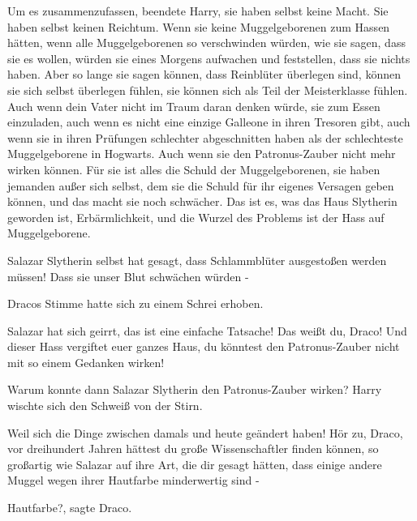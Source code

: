 \glqq Um es zusammenzufassen\grqq{}, beendete Harry, \glqq sie haben selbst
keine Macht. Sie haben selbst keinen Reichtum. Wenn sie keine Muggelgeborenen
zum Hassen hätten, wenn alle Muggelgeborenen so verschwinden würden, wie sie
sagen, dass sie es wollen, würden sie eines Morgens aufwachen und feststellen,
dass sie nichts haben. Aber so lange sie sagen können, dass Reinblüter überlegen
sind, können sie sich selbst überlegen fühlen, sie können sich als Teil der
Meisterklasse fühlen. Auch wenn dein Vater nicht im Traum daran denken würde,
sie zum Essen einzuladen, auch wenn es nicht eine einzige Galleone in ihren
Tresoren gibt, auch wenn sie in ihren Prüfungen schlechter abgeschnitten haben
als der schlechteste Muggelgeborene in Hogwarts. Auch wenn sie den
Patronus-Zauber nicht mehr wirken können. Für sie ist alles die Schuld der
Muggelgeborenen, sie haben jemanden außer sich selbst, dem sie die Schuld für
ihr eigenes Versagen geben können, und das macht sie noch schwächer. Das ist es,
was das Haus Slytherin geworden ist, Erbärmlichkeit, und die Wurzel des Problems
ist der Hass auf Muggelgeborene.\grqq{}

\glqq Salazar Slytherin selbst hat gesagt, dass Schlammblüter ausgestoßen werden
müssen! Dass sie unser Blut schwächen würden -\grqq{}

Dracos Stimme hatte sich zu einem Schrei erhoben.

\glqq Salazar hat sich geirrt, das ist eine einfache Tatsache! Das weißt du,
Draco! Und dieser Hass vergiftet euer ganzes Haus, du könntest den
Patronus-Zauber nicht mit so einem Gedanken wirken!\grqq{}

\glqq Warum konnte dann Salazar Slytherin den Patronus-Zauber wirken?\grqq{}
Harry wischte sich den Schweiß von der Stirn.

\glqq Weil sich die Dinge zwischen damals und heute geändert haben! Hör zu,
Draco, vor dreihundert Jahren hättest du große Wissenschaftler finden können, so
großartig wie Salazar auf ihre Art, die dir gesagt hätten, dass einige andere
Muggel wegen ihrer Hautfarbe minderwertig sind -\grqq{}

\glqq Hautfarbe?\grqq{}, sagte Draco.


